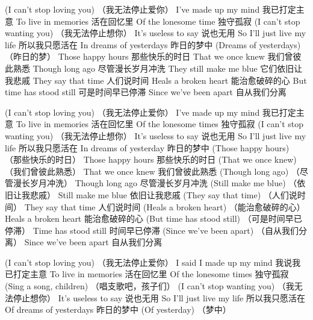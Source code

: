 (I can't stop loving you)
（我无法停止爱你）
I've made up my mind
我已打定主意
To live in memories
活在回忆里
Of the lonesome time
独守孤寂
(I can't stop wanting you)
（我无法停止想你）
It's useless to say
说也无用
So I'll just live my life
所以我只愿活在
In dreams of yesterdays
昨日的梦中
(Dreams of yesterdays)
（昨日的梦）
Those happy hours
那些快乐的时日
That we once knew
我们曾彼此熟悉
Though long ago
尽管漫长岁月冲洗
They still make me blue
它们依旧让我悲戚
They say that time
人们说时间
Heals a broken heart
能治愈破碎的心
But time has stood still
可是时间早已停滞
Since we've been apart
自从我们分离

(I can't stop loving you)
（我无法停止爱你）
I've made up my mind
我已打定主意
To live in memories
活在回忆里
Of the lonesome times
独守孤寂
(I can't stop wanting you)
（我无法停止想你）
It's useless to say
说也无用
So I'll just live my life
所以我只愿活在
In dreams of yesterday
昨日的梦中
(Those happy hours)
（那些快乐的时日）
Those happy hours
那些快乐的时日
(That we once knew)
（我们曾彼此熟悉）
That we once knew
我们曾彼此熟悉
(Though long ago)
（尽管漫长岁月冲洗）
Though long ago
尽管漫长岁月冲洗
(Still make me blue)
（依旧让我悲戚）
Still make me blue
依旧让我悲戚
(They say that time)
（人们说时间）
They say that time
人们说时间
(Heals a broken heart)
（能治愈破碎的心）
Heals a broken heart
能治愈破碎的心
(But time has stood still)
（可是时间早已停滞）
Time has stood still
时间早已停滞
(Since we've been apart)
（自从我们分离）
Since we've been apart
自从我们分离

(I can't stop loving you)
（我无法停止爱你）
I said I made up my mind
我说我已打定主意
To live in memories
活在回忆里
Of the lonesome times
独守孤寂
(Sing a song, children)
（唱支歌吧，孩子们）
(I can't stop wanting you)
（我无法停止想你）
It's useless to say
说也无用
So I'll just live my life
所以我只愿活在
Of dreams of yesterdays
昨日的梦中
(Of yesterday)
（梦中）
